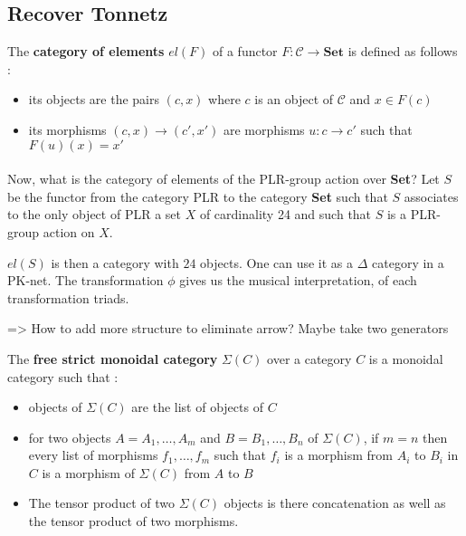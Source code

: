 \documentclass{report}
\begin{document}
\subsection{Recover Tonnetz}


\begin{defn} The \textbf{category of elements} $el(F)$ of a functor $F : \mathcal{C}\rightarrow \textbf{Set}$ is defined as follows :
    \begin{itemize}
        \item its objects are the pairs $(c,x)$ where $c$ is an object of $\mathcal{C}$ and $x\in F(c)$
        \item its morphisms $(c,x)\rightarrow (c',x')$ are morphisms $u : c\rightarrow c'$ such that $F(u)(x) = x'$
    \end{itemize}
\end{defn}
\paragraph{}
Now, what is the category of elements of the PLR-group action over \textbf{Set}? Let $S$ be the functor from the category PLR to the category \textbf{Set} such that $S$ associates to the only object of PLR a set $X$ of cardinality 24 and such that $S$ is a PLR-group action on $X$.

$el(S)$ is then a category with $24$ objects. One can use it as a $\Delta$ category in a PK-net. The transformation $\phi$ gives us the musical interpretation, of each transformation triads.

=> How to add more structure to eliminate arrow? Maybe take two generators



\begin{defn}
    The \textbf{free strict monoidal category} $ \Sigma (C)$ over a category $C$ is a monoidal category such that :
    \begin{itemize}
        \item objects of $\Sigma (C)$ are the list of objects of $C$
        \item for two objects $A = A_1,\dots,A_m$ and $B = B_1,\dots,B_n$ of $\Sigma (C)$, if $m = n$ then every list of morphisms $f_1,\dots,f_m$ such that $f_i$ is a morphism from $A_i$ to $B_i$ in $C$ is a morphism of $\Sigma(C)$ from $A$ to $B$
        \item The tensor product of two $\Sigma(C)$ objects is there concatenation as well as the tensor product of two morphisms.
    \end{itemize}
\end{defn}
\end{document}
